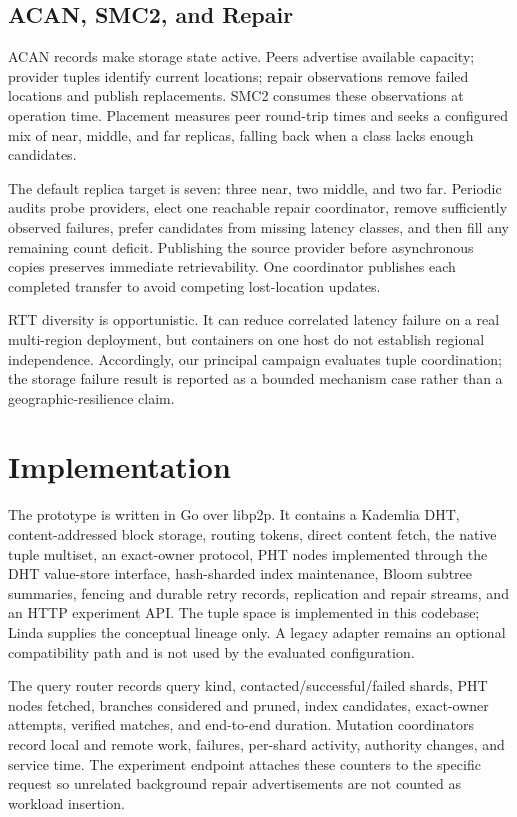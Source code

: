 \documentclass[conference]{IEEEtran}
\begin{document}
\subsection{ACAN, SMC2, and Repair}

ACAN records make storage state active. Peers advertise available capacity;
provider tuples identify current locations; repair observations remove failed
locations and publish replacements. SMC2 consumes these observations at
operation time. Placement measures peer round-trip times and seeks a configured
mix of near, middle, and far replicas, falling back when a class lacks enough
candidates.

The default replica target is seven: three near, two middle, and two far.
Periodic audits probe providers, elect one reachable repair coordinator,
remove sufficiently observed failures, prefer candidates from missing latency
classes, and then fill any remaining count deficit. Publishing the source
provider before asynchronous copies preserves immediate retrievability. One
coordinator publishes each completed transfer to avoid competing lost-location
updates.

RTT diversity is opportunistic. It can reduce correlated latency failure on a
real multi-region deployment, but containers on one host do not establish
regional independence. Accordingly, our principal campaign evaluates tuple
coordination; the storage failure result is reported as a bounded mechanism
case rather than a geographic-resilience claim.

\section{Implementation}
\label{sec:implementation}

The prototype is written in Go over libp2p. It contains a Kademlia DHT,
content-addressed block storage, routing tokens, direct content fetch, the
native tuple multiset, an exact-owner protocol, PHT nodes implemented through
the DHT value-store interface, hash-sharded index maintenance, Bloom subtree
summaries, fencing and durable retry records, replication and repair streams,
and an HTTP experiment API. The tuple space is implemented in this codebase;
Linda supplies the conceptual lineage only. A legacy adapter remains an
optional compatibility path and is not used by the evaluated configuration.

The query router records query kind, contacted/successful/failed shards, PHT
nodes fetched, branches considered and pruned, index candidates, exact-owner
attempts, verified matches, and end-to-end duration. Mutation coordinators
record local and remote work, failures, per-shard activity, authority changes,
and service time. The experiment endpoint attaches these counters to the
specific request so unrelated background repair advertisements are not counted
as workload insertion.
\end{document}
